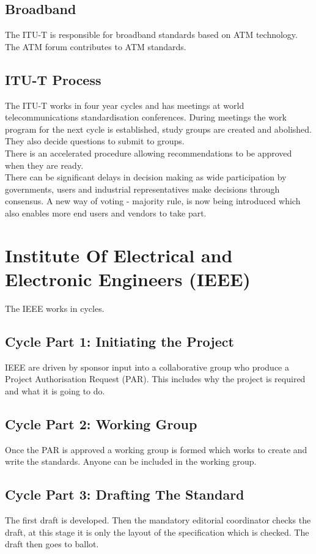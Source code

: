 \subsection*{Broadband}
The ITU-T is responsible for broadband standards based on ATM technology. The ATM forum contributes to ATM standards.
\subsection*{ITU-T Process}
The ITU-T works in four year cycles and has meetings at world telecommunications standardisation conferences. During meetings the work program for the next cycle is established, study groups are created and abolished. They also decide questions to submit to groups.\\
There is an accelerated procedure allowing recommendations to be approved when they are ready. \\
There can be significant delays in decision making as wide participation by governments, users and industrial representatives make decisions through consensus. A new way of voting - majority rule, is now being introduced which also enables more end users and vendors to take part. 

\section*{Institute Of Electrical and Electronic Engineers (IEEE)}
The IEEE works in cycles.
\subsection*{Cycle Part 1: Initiating the Project}
IEEE are driven by sponsor input into a collaborative group who produce a Project Authorisation Request (PAR). This includes why the project is required and what it is going to do.
\subsection*{Cycle Part 2: Working Group}
Once the PAR is approved a working group is formed which works to create and write the standards. Anyone can be included in the working group.
\subsection*{Cycle Part 3: Drafting The Standard}
The first draft is developed. Then the mandatory editorial coordinator checks the draft, at this stage it is only the layout of the specification which is checked. The draft then goes to ballot.
